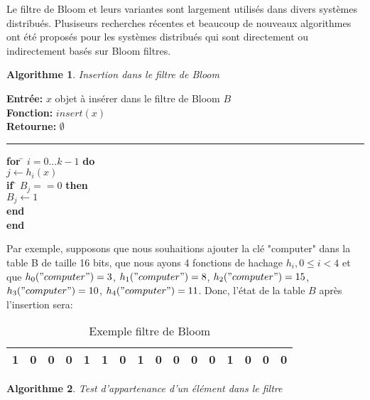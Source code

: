	Le filtre de Bloom et leurs variantes sont largement utilisés dans divers systèmes distribués. Plusiseurs recherches récentes et beaucoup de nouveaux algorithmes ont été proposés pour les systèmes distribués qui sont directement ou indirectement basés sur Bloom filtres\cite{theory-and-practice-of-bloom-filters-for-distributed-systems}.
	
\newtheorem{algorithme}{Algorithme}
\begin{algorithme}
	Insertion dans le filtre de Bloom
\end{algorithme}

\begin{flushleft}
	\begin{framed}
		\textbf{Entrée:} $x$ objet à insérer dans le filtre de Bloom $B$\\
		\textbf{Fonction:} $insert(x)$\\
		\textbf{Retourne:} $\emptyset$
		\noindent\rule{\linewidth}{0.5pt}

		\begin{tabbing}
			\textbf{for} \= $i = 0 ... k - 1$ \textbf{do}\\
					\> $j \leftarrow h_i(x)$\\
					\> \textbf{if} \= $B_j == 0$ \textbf{then}\\
					\> \> $B_j \leftarrow 1$\\
					\> \textbf{end}\\
			\textbf{end}
	    	\end{tabbing}		
	\end{framed}
\end{flushleft}
	
	Par exemple, supposons que nous souhaitions ajouter la clé "computer" dans la table B de taille 16 bits, que nous ayons 4 fonctions de hachage $ h_i, 0 \leq i < 4 $ et que $ h_0("computer") = 3$, $ h_1("computer") = 8$, $ h_2("computer") = 15$, $h_3("computer") = 10$, $h_4("computer") = 11 $. Donc, l'état de la table $ B $ après l'insertion sera:
	\begin{table}[!h]
		\centering		
		\begin{tabular}{|l|*{14}{c|}r|}
		\hline
			1 & 0 & 0 & 0 & 1 & 1 & 0 & 1 & 0 & 0 & 0 & 0 & 1 & 0 & 0 & 0 \\
		\hline
		\end{tabular}
		\caption{Exemple filtre de Bloom}
		\label{filtredeBloom/exemple}
	\end{table}
	
\begin{algorithme}
	Test d'appartenance d'un élément dans le filtre
\end{algorithme}

